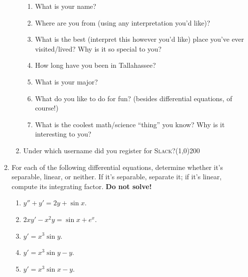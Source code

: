 \documentclass[12 pt]{article}
\begin{document}
\begin{enumerate}[leftmargin=0in, rightmargin=-0.25in]
\begin{enumerate}[itemsep=0.25in]
\begin{enumerate}[label=(\roman*),itemsep=3mm]
			\item What is your name?
			\item Where are you from (using any interpretation you'd like)?
			\item What is the best (interpret this however you'd like) place you've ever visited/lived? Why is it so special to you?
			\item How long have you been in Tallahassee?
			\item What is your major?
			\item What do you like to do for fun? (besides differential equations, of course!)
			\item What is the coolest math/science ``thing'' you know? Why is it interesting to you?
		\end{enumerate}
		\item Under which username did you register for \textsc{Slack}?\hspace{6mm}\line(1,0){200}
	\end{enumerate}

	\newpage
	
	\item For each of the following differential equations, determine whether it's separable, linear, or neither. If it's separable, separate it; if it's linear, compute its integrating factor. \textbf{Do not solve!}
	\begin{enumerate}
		\item $y''+y'=2y + \sin{x}$.
		\item $2xy'-x^2y=\sin{x}+e^x$.
		\item $y'=x^3\sin{y}$.
		\item $y'=x^3\sin{y}-y$.
		\item $y'=x^3\sin{x}-y$.
	\end{enumerate}


\end{enumerate}
\end{document}

